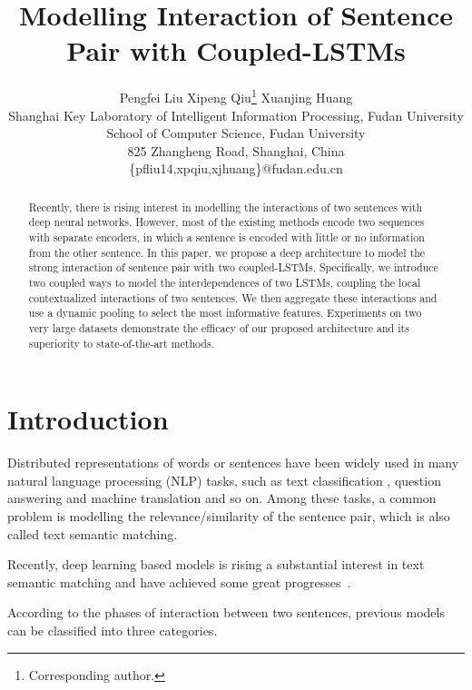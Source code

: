 \documentclass{article}
\title{Modelling Interaction of Sentence Pair with Coupled-LSTMs}
\author{Pengfei Liu \quad Xipeng Qiu\thanks{Corresponding author.} \quad Xuanjing Huang\\
Shanghai Key Laboratory of Intelligent Information Processing, Fudan University\\
School of Computer Science, Fudan University\\
825 Zhangheng Road, Shanghai, China\\
\{pfliu14,xpqiu,xjhuang\}@fudan.edu.cn}
\date{}
\begin{document}
\maketitle
\begin{abstract}
Recently, there is rising interest in modelling the interactions of two sentences with deep neural networks. However, most of the existing methods encode two sequences with separate encoders, in which a sentence is encoded with little or no information from the other sentence. In this paper, we propose a deep architecture to model the strong  interaction of sentence pair with two coupled-LSTMs. Specifically, we introduce two coupled ways to model the interdependences of two LSTMs, coupling the local contextualized interactions of two sentences. We then aggregate these interactions and use a dynamic pooling to select the most informative features. Experiments on two very large datasets demonstrate the efficacy of our proposed architecture and its superiority to state-of-the-art methods.
\end{abstract}



\section{Introduction}

Distributed representations of words or sentences have been widely used in many natural language processing (NLP) tasks, such as text classification \cite{kalchbrenner2014convolutional}, question answering and machine translation \cite{sutskever2014sequence} and so on.
Among these tasks, a common problem is modelling the relevance/similarity of the sentence pair, which is also called text semantic matching.

Recently, deep learning based models is rising a substantial interest in text semantic matching and have achieved some great progresses~\cite{hu2014convolutional,qiu2015convolutional,wan2015deep}.




According to the phases of interaction between two sentences, previous models can be classified into three categories.

\vspace{-1em}
\end{document}
